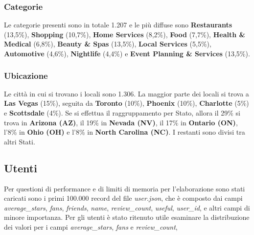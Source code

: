 \documentclass[12pt]{article}
\begin{document}
\subsubsection{Categorie}
Le categorie presenti sono in totale 1.207 e le più diffuse sono \textbf{Restaurants} (13,5\%), \textbf{Shopping} (10,7\%), \textbf{Home Services} (8,2\%), \textbf{Food} (7,7\%), \textbf{Health \& Medical} (6,8\%), \textbf{Beauty \& Spas} (13,5\%), \textbf{Local Services} (5,5\%), \textbf{Automotive} (4,6\%), \textbf{Nightlife} (4,4\%) e \textbf{Event Planning \& Services} (13,5\%).

\subsubsection{Ubicazione}
Le città in cui si trovano i locali sono 1.306. La maggior parte dei locali si trova a \textbf{Las Vegas} (15\%), seguita da \textbf{Toronto} (10\%), \textbf{Phoenix} (10\%), \textbf{Charlotte} (5\%) e \textbf{Scottsdale} (4\%).\newline
Se si effettua il raggruppamento per Stato, allora il 29\% si trova in \textbf{Arizona (AZ)}, il 19\% in \textbf{Nevada (NV)}, il 17\% in \textbf{Ontario (ON)}, l'8\% in \textbf{Ohio (OH)} e l'8\% in \textbf{North Carolina (NC)}. I restanti sono divisi tra altri Stati.

\subsection{Utenti}
Per questioni di performance e di limiti di memoria per l'elaborazione sono stati caricati sono i primi 100.000 record del file \textit{user.json}, che è composto dai campi \textit{average\_stars}, \textit{fans}, \textit{friends}, \textit{name}, \textit{review\_count}, \textit{useful}, \textit{user\_id}, e altri campi di minore importanza. \newline
Per gli utenti è stato ritenuto utile esaminare la distribuzione dei valori per i campi \textit{average\_stars}, \textit{fans} e \textit{review\_count},
\end{document}

